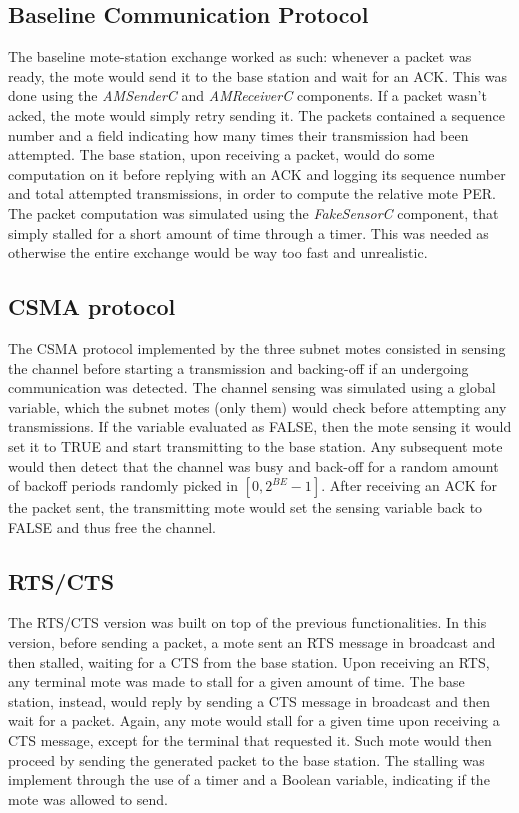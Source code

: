 \documentclass{article}
\begin{document}
\subsection{Baseline Communication Protocol}
The baseline mote-station exchange worked as such: whenever a packet was ready, the mote would send it to the base station and wait for an ACK. This was done using the \textit{AMSenderC} and \textit{AMReceiverC} components. If a packet wasn’t acked, the mote would simply retry sending it. The packets contained a sequence number and a field indicating how many times their transmission had been attempted. The base station, upon receiving a packet, would do some computation on it before replying with an ACK and logging its sequence number and total attempted transmissions, in order to compute the relative mote PER. The packet computation was simulated using the \textit{FakeSensorC} component, that simply stalled for a short amount of time through a timer. This was needed as otherwise the entire exchange would be way too fast and unrealistic.

\subsection{CSMA protocol}
The CSMA protocol implemented by the three subnet motes consisted in sensing the channel before starting a transmission and backing-off if an undergoing communication was detected. The channel sensing was simulated using a global variable, which the subnet motes (only them) would check before attempting any transmissions. If the variable evaluated as FALSE, then the mote sensing it would set it to TRUE and start transmitting to the base station. Any subsequent mote would then detect that the channel was busy and back-off for a random amount of backoff periods randomly picked in $[0, 2^{BE} - 1]$. After receiving an ACK for the packet sent, the transmitting mote would set the sensing variable back to FALSE and thus free the channel.

\subsection{RTS/CTS}
The RTS/CTS version was built on top of the previous functionalities. In this version, before sending a packet, a mote sent an RTS message in broadcast and then stalled, waiting for a CTS from the base station. Upon receiving an RTS, any terminal mote was made to stall for a given amount of time. The base station, instead, would reply by sending a CTS message in broadcast and then wait for a packet. Again, any mote would stall for a given time upon receiving a CTS message, except for the terminal that requested it. Such mote would then proceed by sending the generated packet to the base station. The stalling was implement through the use of a timer and a Boolean variable, indicating if the mote was allowed to send.
\end{document}
